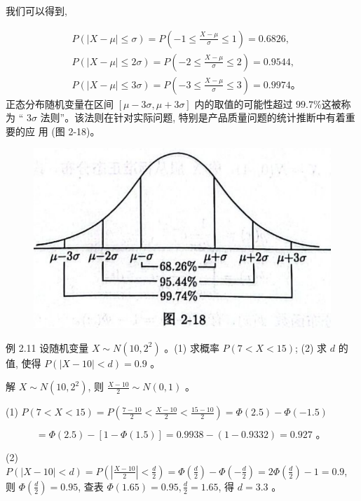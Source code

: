 \documentclass{beamer}
\begin{document}
	\begin{frame}
		我们可以得到,
		
		$$
		\begin{aligned}
			& P(|X-\mu| \leqslant \sigma)=P\left(-1 \leqslant \frac{X-\mu}{\sigma} \leqslant 1\right)=0.6826, \\
			& P(|X-\mu| \leqslant 2 \sigma)=P\left(-2 \leqslant \frac{X-\mu}{\sigma} \leqslant 2\right)=0.9544, \\
			& P(|X-\mu| \leqslant 3 \sigma)=P\left(-3 \leqslant \frac{X-\mu}{\sigma} \leqslant 3\right)=0.9974 。
		\end{aligned}
		$$
		正态分布随机变量在区间 $[\mu-3 \sigma, \mu+3 \sigma]$ 内的取值的可能性超过 $99.7 \%$这被称为 “ $3 \sigma$ 法则”。该法则在针对实际问题, 特别是产品质量问题的统计推断中有着重要的应 用 (图 2-18)。
	\end{frame}
	
	\begin{frame}
		\begin{figure}
			\centering
			\includegraphics[scale = 0.4]{figures/figure2-18}
		\end{figure}
	\end{frame}
	
	\begin{frame}
		例 2.11 设随机变量 $X \sim N\left(10,2^{2}\right)$ 。(1) 求概率 $P(7<X<15)$; (2) 求 $d$ 的值, 使得 $P(|X-10|<d)=0.9$ 。
	\end{frame}
	
	\begin{frame}
		解 $X \sim N\left(10,2^{2}\right)$, 则 $\frac{X-10}{2} \sim N(0,1)$ 。
		
		(1) $P(7<X<15)=P\left(\frac{7-10}{2}<\frac{X-10}{2}<\frac{15-10}{2}\right)=\Phi(2.5)-\Phi(-1.5)$
		
		$$
		=\Phi(2.5)-[1-\Phi(1.5)]=0.9938-(1-0.9332)=0.927 \text { 。 }
		$$
		
		(2) $P(|X-10|<d)=P\left(\left|\frac{X-10}{2}\right|<\frac{d}{2}\right)=\Phi\left(\frac{d}{2}\right)-\Phi\left(-\frac{d}{2}\right)=2 \Phi\left(\frac{d}{2}\right)-1=0.9$, 则 $\Phi\left(\frac{d}{2}\right)=0.95$, 查表 $\Phi(1.65)=0.95, \frac{d}{2}=1.65$, 得 $d=3.3$ 。
	\end{frame}
	
\end{document}
